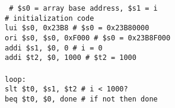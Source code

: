 \documentclass[../main.tex]{subfiles}
\begin{document}
\texttt{
    \# \$s0 = array base address, \$s1 = i \\
    \# initialization code \\
    \hspace*{0cm} \hspace*{0cm} lui \$s0, 0x23B8 \hspace*{0cm} \hspace*{0cm} \hspace*{0cm} \hspace*{0cm} \hspace*{0cm} \hspace*{0cm} \hspace*{0cm} \# \$s0 = 0x23B80000 \\
    \hspace*{0cm} \hspace*{0cm} ori \$s0, \$s0, 0xF000 \hspace*{0cm} \hspace*{0cm} \# \$s0 = 0x23B8F000 \\
    \hspace*{0cm} \hspace*{0cm} addi \$s1, \$0, 0 \hspace*{0cm} \hspace*{0cm} \hspace*{0cm} \hspace*{0cm} \hspace*{0cm} \hspace*{0cm} \hspace*{0cm} \# i = 0 \\
    \hspace*{0cm} \hspace*{0cm} addi \$t2, \$0, 1000 \hspace*{0cm} \hspace*{0cm} \hspace*{0cm} \hspace*{0cm} \# \$t2 = 1000 \\
    \\
    loop: \\
    \hspace*{0cm} \hspace*{0cm} slt \$t0, \$s1, \$t2 \hspace*{0cm} \hspace*{0cm} \hspace*{0cm} \hspace*{0cm} \hspace*{0cm} \# i < 1000? \\
    \hspace*{0cm} \hspace*{0cm} beq \$t0, \$0, done \hspace*{0cm} \hspace*{0cm} \hspace*{0cm} \hspace*{0cm} \hspace*{0cm} \# if not then done \\
}
\end{document}

